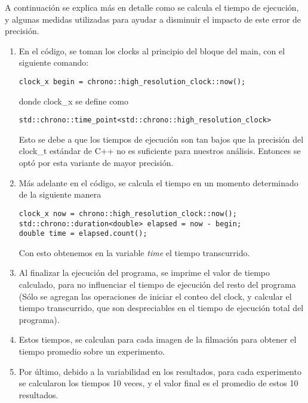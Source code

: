 \documentclass{article}
\begin{document}
A continuación se explica más en detalle como se calcula el tiempo de ejecución, y algunas medidas utilizadas para ayudar a disminuir el impacto de este error de precisión.

\begin{enumerate}
\item En el código, se toman los clocks al principio del bloque del main, con el siguiente comando: 
\begin{lstlisting}
clock_x begin = chrono::high_resolution_clock::now();
\end{lstlisting}
donde clock\_x se define como
\begin{lstlisting}
std::chrono::time_point<std::chrono::high_resolution_clock>
\end{lstlisting}
Esto se debe a que los tiempos de ejecución son tan bajos que la precisión del clock\_t estándar de C++ no es suficiente para nuestros análisis. Entonces se optó por esta variante de mayor precisión.
\item Más adelante en el código, se calcula el tiempo en un momento determinado de la siguiente manera
\begin{lstlisting}
clock_x now = chrono::high_resolution_clock::now();
std::chrono::duration<double> elapsed = now - begin;
double time = elapsed.count();
\end{lstlisting}
Con esto obtenemos en la variable \emph{time} el tiempo transcurrido.
\item Al finalizar la ejecución del programa, se imprime el valor de tiempo calculado, para no influenciar el tiempo de ejecución del resto del programa (Sólo se agregan las operaciones de iniciar el conteo del clock, y calcular el tiempo transcurrido, que son despreciables en el tiempo de ejecución total del programa).
\item Estos tiempos, se calculan para cada imagen de la filmación para obtener el tiempo promedio sobre un experimento.
\item Por último, debido a la variabilidad en los resultados, para cada experimento se calcularon los tiempos 10 veces, y el valor final es el promedio de estos 10 resultados.
\end{enumerate}
\end{document}
